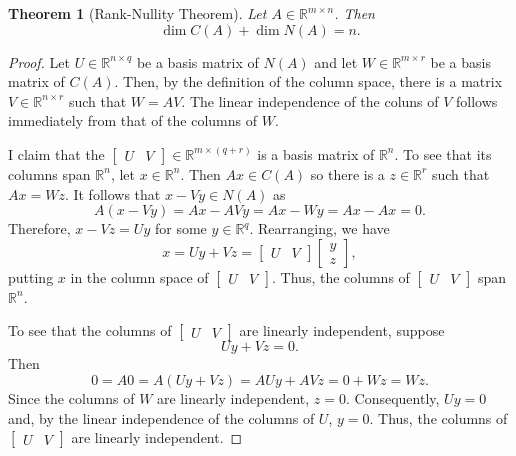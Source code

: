 \documentclass[12pt]{amsart}
\newtheorem{theorem}{Theorem}[section]
\theoremstyle{definition}
\theoremstyle{remark}
\numberwithin{equation}{section}
\newcommand{\RR}{\mathbb{R}}
\begin{document}
\begin{theorem}[Rank-Nullity Theorem]
    Let $A\in\RR^{m\times n}$. Then
    \[
        \dim C(A) + \dim N(A) = n.
    \]
\end{theorem}
\begin{proof}
    Let $U\in\mathbb{R}^{n\times q}$ be a basis matrix of $N(A)$ and let
    $W\in\RR^{m\times r}$ be a basis matrix of $C(A)$.
    Then, by the definition of the column space, there is a matrix $V\in\RR^{n\times r}$ such that
    $W = AV$.
    The linear independence of the coluns of $V$ follows immediately from
    that of the columns of $W$.
    
    I claim that the $\begin{bmatrix}
        U&V
    \end{bmatrix}\in\RR^{m\times(q + r)}$ is a basis matrix of $\RR^n$.
    To see that its columns span $\RR^n$, let $x\in\RR^n$.
    Then $Ax\in C(A)$ so there is a $z\in\RR^r$ such that $Ax=Wz$.
    It follows that $x - Vy\in N(A)$ as
    \[
        A(x-Vy) = Ax - AVy = Ax - Wy = Ax - Ax = 0.
    \]
    Therefore, $x-Vz = Uy$ for some $y\in\RR^q$. Rearranging, we have
    \[
        x = Uy + Vz = \begin{bmatrix}U & V\end{bmatrix}
        \begin{bmatrix}y\\z\end{bmatrix},
    \]
    putting $x$ in the column space of $\begin{bmatrix}U & V\end{bmatrix}$.
    Thus, the columns of $\begin{bmatrix}U & V\end{bmatrix}$ span $\RR^n$.

    To see that the columns of $\begin{bmatrix}U & V\end{bmatrix}$ are
    linearly independent, suppose
    \[
        Uy + Vz = 0.
    \]
    Then
    \[
        0 = A0 = A(Uy+Vz) = AUy + AVz = 0 + Wz = Wz.
    \]
    Since the columns of $W$ are linearly independent, $z=0$.
    Consequently, $Uy=0$ and, by the linear independence of the columns of $U$,
    $y=0$. Thus, the columns of $\begin{bmatrix}U & V\end{bmatrix}$
    are linearly independent.
\end{proof}
\end{document}
